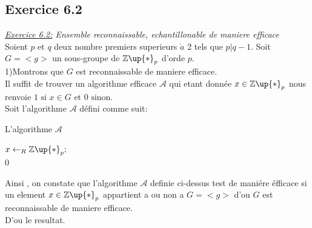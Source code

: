 \documentclass[10pt]{beamer}
\begin{document}
\begin{frame}
\section{Exercice 6.2}

\emph{\underline{Exercice 6.2:} Ensemble reconnaissable, echantillonable de maniere efficace}
\\Soient $p \text{ et } q$ deux nombre premiers superieurs $\grave{a}$ 2 tels que $p| q-1$. Soit $G = <g>$ un sous-groupe de $\mathbb{Z\up{*}}_{p}$ d'orde $p$.
\\1)Montrons que $G$ est reconnaissable de maniere efficace.
\\Il suffit de trouver un algorithme efficace $\mathcal{A}$ qui etant donn\'{e}e $x \in \mathbb{Z\up{*}}_{p}$ nous renvoie $1 \text{ si } x \in G \text{ et } 0 \text{ sinon}$.
\\Soit l'algorithme  $\mathcal{A}$ d\'{e}fini comme suit:

\begin{algorithm}[H]
\DontPrintSemicolon
\caption{L'algorithme $\mathcal{A}$}
\BlankLine
$x \gets _{R} \mathbb{Z\up{*}}_{p};$\\
\Return $0$
\end{algorithm}

Ainsi , on constate que l'algorithme $\mathcal{A}$ definie ci-dessus test de mani\'{e}re \'{e}fficace si un element $x \in \mathbb{Z\up{*}}_{p}$ appartient a ou non a $G = <g>$ d'ou $G$ est reconnaissable de maniere efficace.
\\D'ou le resultat.

\end{frame}
\end{document}
